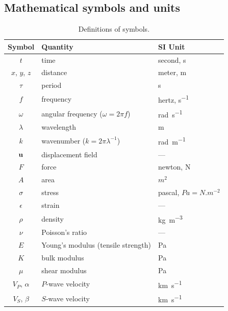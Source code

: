 \subsection{Mathematical symbols and units}
\begin{table}[hbtp]
    \centering
    \caption{Definitions of symbols.}
    \label{tab:seismosym}
    \begin{tabular}{@{}cll@{}}
        \toprule
        \textbf{Symbol} &
        \textbf{Quantity} &
        \textbf{SI Unit} \\
        \midrule
        $t$             & time                          & second, \si{s} \\
        $x$, $y$, $z$   & distance                      & meter, \si{m} \\
        $\tau$          & period                        & \si{s} \\
        $f$             & frequency                     & hertz, \si{s^{-1}} \\
        $\omega$        & angular frequency ($\omega = 2 \pi f$) & \si{rad.s^{-1}} \\
        $\lambda$       & wavelength                    & \si{m} \\
        $k$             & wavenumber ($k = 2\pi \lambda^{-1}$) & \si{rad.m^{-1}} \\
        $\vb{u}$      & displacement field            & --- \\
        $F$             & force                         & newton, \si{N} \\
        $A$             & area                          & $m^2$ \\
        $\sigma$        & stress                        & pascal, $\si{Pa} = \si{N.m^{-2}}$ \\
        $\epsilon$      & strain                        & --- \\
        $\rho$          & density                       & \si{kg.m^{-3}} \\
        $\nu$           & Poisson's ratio               & --- \\
        $E$             & Young's modulus (tensile strength) & \si{Pa} \\
        $K$             & bulk modulus                  & \si{Pa} \\
        $\mu$           & shear modulus                 & \si{Pa} \\
        $V_P$, $\alpha$ & $P$-wave velocity             & \si{km.s^{-1}} \\
        $V_S$, $\beta$  & $S$-wave velocity             & \si{km.s^{-1}} \\
        \bottomrule
    \end{tabular}
\end{table}

